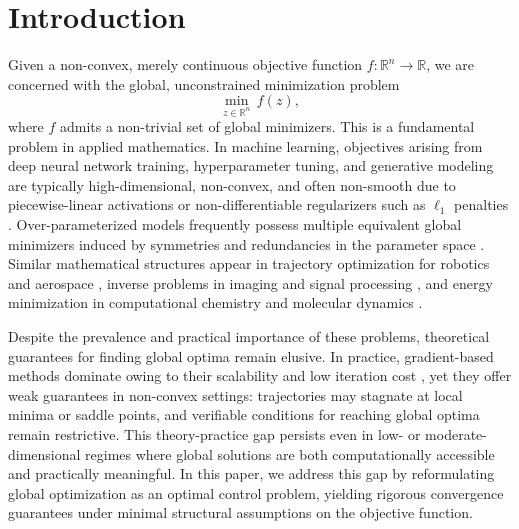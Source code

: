 \documentclass[12pt]{amsart}
\numberwithin{equation}{section}
\theoremstyle{plain}
\begin{document}


\maketitle


\section{Introduction}
Given a non-convex, merely continuous objective function $f:\mathbb{R}^n\to\mathbb{R}$, we are concerned with the global, unconstrained minimization problem
\begin{equation}\label{opt intro}
	\min\limits_{z\in\mathbb{R}^{n}}\, f(z),
\end{equation}
where $f$ admits a non-trivial set of global minimizers. This is a fundamental problem in applied mathematics.
In machine learning, objectives arising from deep neural network training, hyperparameter tuning, and generative modeling are typically high-dimensional, non-convex, and often non-smooth due to piecewise-linear activations or non-differentiable regularizers such as $\ell_1$ penalties \cite{li2018visualizing, choromanska2015loss, goodfellow2014generative}. Over-parameterized models frequently possess multiple equivalent global minimizers induced by symmetries and redundancies in the parameter space \cite{simsek2021geometry,brea2019weight}. Similar mathematical structures appear in trajectory optimization for robotics and aerospace \cite{kelly2017introduction}, inverse problems in imaging and signal processing \cite{nikolova2010fast}, and energy minimization in computational chemistry and molecular dynamics \cite{klepeis2003hybrid}.

Despite the prevalence and practical importance of these problems, theoretical guarantees for finding global optima remain elusive. In practice, gradient-based methods dominate owing to their scalability and low iteration cost \cite{bottou2018optimization}, yet they offer weak guarantees in non-convex settings: trajectories may stagnate at local minima or saddle points, and verifiable conditions for reaching global optima remain restrictive. This theory-practice gap persists even in low- or moderate-dimensional regimes where global solutions are both computationally accessible and practically meaningful.
In this paper, we address this gap by reformulating global optimization as an optimal control problem, yielding rigorous convergence guarantees under minimal structural assumptions on the objective function.
\end{document}
